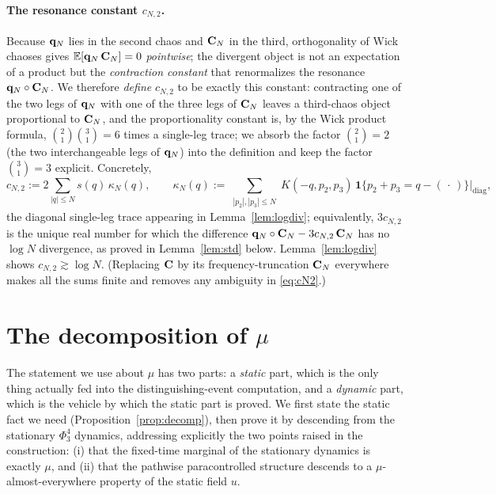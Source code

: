 \paragraph{The resonance constant $c_{N,2}$.}
Because $\mathbf{q}_N$ lies in the second chaos and $\mathbf{C}_N$ in the third,
orthogonality of Wick chaoses gives $\mathbb{E}[\mathbf{q}_N\,\mathbf{C}_N]=0$ \emph{pointwise};
the divergent object is not an expectation of a product but the \emph{contraction
constant} that renormalizes the resonance $\mathbf{q}_N\circ\mathbf{C}_N$. We therefore
\emph{define} $c_{N,2}$ to be exactly this constant: contracting one of the two
legs of $\mathbf{q}_N$ with one of the three legs of $\mathbf{C}_N$ leaves a third-chaos
object proportional to $\mathbf{C}_N$, and the proportionality constant is, by the
Wick product formula, $\binom{2}{1}\binom{3}{1}=6$ times a single-leg trace; we
absorb the factor $\binom{2}{1}=2$ (the two interchangeable legs of $\mathbf{q}_N$)
into the definition and keep the factor $\binom31=3$ explicit. Concretely,
\begin{equation}\label{eq:cN2}
c_{N,2}:=2\sum_{|q|\le N}s(q)\,\kappa_N(q),\qquad
\kappa_N(q):=\sum_{\substack{|p_2|,|p_3|\le N}}K(-q,p_2,p_3)\,\mathbf 1\{p_2+p_3=q-(\,\cdot\,)\}\big|_{\mathrm{diag}},
\end{equation}
the diagonal single-leg trace appearing in Lemma~\ref{lem:logdiv}; equivalently,
$3c_{N,2}$ is the unique real number for which the difference
$\mathbf{q}_N\circ\mathbf{C}_N-3c_{N,2}\,\mathbf{C}_N$ has no $\log N$ divergence, as proved in
Lemma~\ref{lem:std} below. Lemma~\ref{lem:logdiv} shows $c_{N,2}\gtrsim\log N$.
(Replacing $\mathbf{C}$ by its frequency-truncation $\mathbf{C}_N$ everywhere makes all the
sums finite and removes any ambiguity in \eqref{eq:cN2}.)

\section*{The decomposition of $\mu$}

The statement we use about $\mu$ has two parts: a \emph{static} part, which is the
only thing actually fed into the distinguishing-event computation, and a
\emph{dynamic} part, which is the vehicle by which the static part is proved. We
first state the static fact we need (Proposition~\ref{prop:decomp}), then prove it
by descending from the stationary $\Phi^4_3$ dynamics, addressing explicitly the
two points raised in the construction: (i) that the fixed-time marginal of the
stationary dynamics is exactly $\mu$, and (ii) that the pathwise paracontrolled
structure descends to a $\mu$-almost-everywhere property of the static field $u$.

